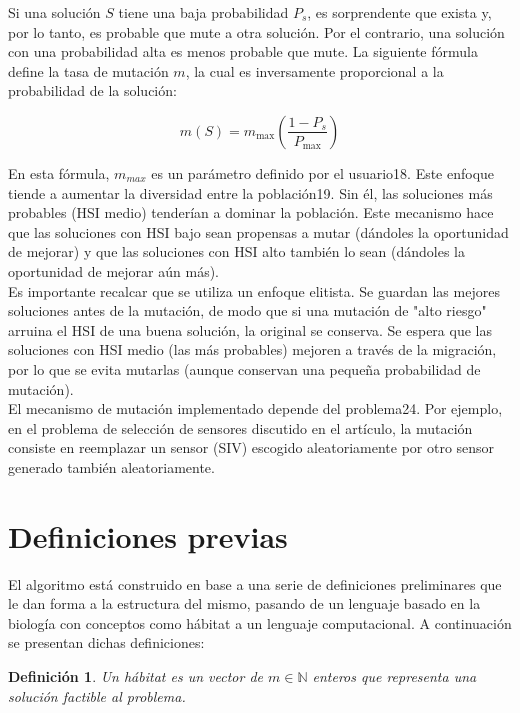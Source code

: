 \documentclass{article}
\newtheorem{mydef}{Definición}
\begin{document}
Si una solución $S$ tiene una baja probabilidad $P_s$, es sorprendente que exista y, por lo tanto, es probable que mute a otra solución. Por el contrario, una solución con una probabilidad alta es menos probable que mute. La siguiente fórmula define la tasa de mutación $m$, la cual es inversamente proporcional a la probabilidad de la solución:

$$m(S) = m_{\text{max}} \left( \frac{1 - P_s}{P_{\text{max}}} \right)$$

En esta fórmula, $m_{max}$ es un parámetro definido por el usuario18. Este enfoque tiende a aumentar la diversidad entre la población19. Sin él, las soluciones más probables (HSI medio) tenderían a dominar la población. Este mecanismo hace que las soluciones con HSI bajo sean propensas a mutar (dándoles la oportunidad de mejorar) y que las soluciones con HSI alto también lo sean (dándoles la oportunidad de mejorar aún más).\\

Es importante recalcar que se utiliza un enfoque elitista. Se guardan las mejores soluciones antes de la mutación, de modo que si una mutación de "alto riesgo" arruina el HSI de una buena solución, la original se conserva. Se espera que las soluciones con HSI medio (las más probables) mejoren a través de la migración, por lo que se evita mutarlas (aunque conservan una pequeña probabilidad de mutación).\\

El mecanismo de mutación implementado depende del problema24. Por ejemplo, en el problema de selección de sensores discutido en el artículo, la mutación consiste en reemplazar un sensor (SIV) escogido aleatoriamente por otro sensor generado también aleatoriamente.

\section{Definiciones previas}
\label{sec:meta1_algoritmo}

El algoritmo está construido en base a una serie de definiciones preliminares que le dan forma a la estructura del mismo, pasando de un lenguaje
basado en la biología con conceptos como hábitat a un lenguaje computacional. 
A continuación se presentan dichas definiciones:

\begin{mydef}
    Un hábitat es un vector de $m \in \mathbb{N}$ enteros que representa una solución factible al problema.
\end{mydef}
\end{document}
